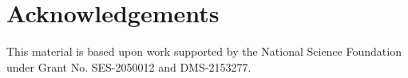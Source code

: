 \documentclass[sn-basic]{sn-jnl}
\theoremstyle{thmstyleone}
\begin{document}
%         












\section*{Acknowledgements}
This material is based upon work supported by the National Science Foundation
    under Grant No. SES-2050012 and DMS-2153277.

%

\end{document}
